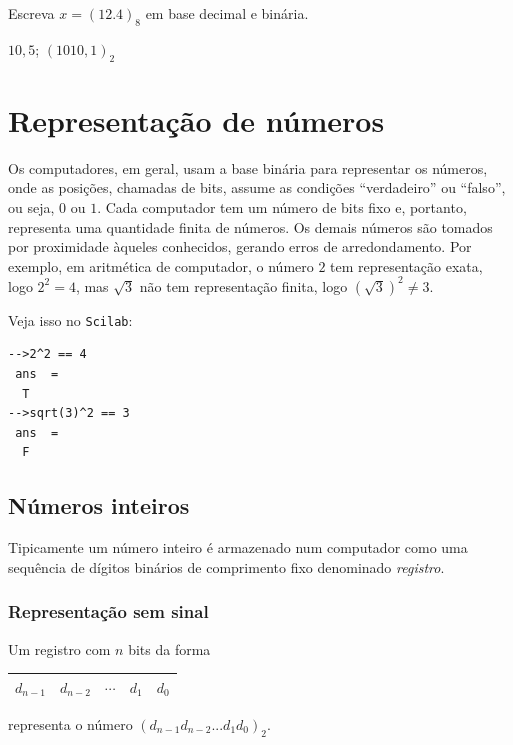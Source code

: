\begin{Exercise} Escreva $x=(12.4)_8$ em base decimal e binária.
\end{Exercise}
\begin{Answer}
  \begin{tiny}
    $10,5$; $(1010,1)_2$
  \end{tiny}
\end{Answer}

\section{Representação de números}

Os computadores, em geral, usam a base binária para representar os números, onde as posições, chamadas de bits, assume as condições ``verdadeiro'' ou ``falso'', ou seja, $0$ ou $1$. Cada computador tem um número de bits fixo e, portanto, representa uma quantidade finita de números. Os demais números são tomados por proximidade àqueles conhecidos, gerando erros de arredondamento. Por exemplo, em aritmética de computador, o número $2$ tem representação exata, logo $2^2=4$, mas $\sqrt{3}$ não tem representação finita, logo $(\sqrt{3})^2\neq 3$. 

\ifisscilab
Veja isso no \verb+Scilab+:
\begin{verbatim}
-->2^2 == 4
 ans  =
  T  
-->sqrt(3)^2 == 3
 ans  =
  F  
\end{verbatim}
\fi

\subsection{Números inteiros}

Tipicamente um número inteiro é armazenado num computador como uma sequência de dígitos binários de comprimento fixo denominado \emph{registro}.

\subsubsection{Representação sem sinal}
Um registro com $n$ bits da forma
\begin{tabular}{|c|c|c|c|c|}\hline
    $d_{n-1}$ & $d_{n-2}$ & $\cdots$ & $d_1$ & $d_0$\\\hline
\end{tabular}
representa o número $(d_{n-1}d_{n-2}...d_1d_0)_2$. 

